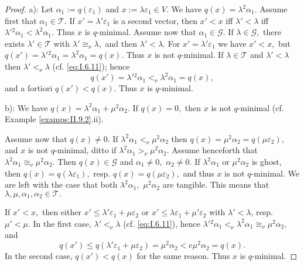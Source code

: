\documentclass [12pt,a4paper,reqno]{amsart}
\begin{document}
\begin{proof}
a): Let ${\alpha} _1:=q({\varepsilon}_1)$ and $x:={\lambda} {\varepsilon}_1\in V.$ We have $q(x)={\lambda} ^2{\alpha} _1.$ Assume
first that ${\alpha} _1\in{\mathcal T}.$ If $x'={\lambda} '{\varepsilon}_1$ is a second vector, then $x'<x$ iff ${\lambda} '<{\lambda} $
iff ${\lambda} '{}^2{\alpha} _1<{\lambda} ^2{\alpha} _1.$ Thus $x$ is $q$-minimal. Assume now that ${\alpha} _1\in{\mathcal G}.$ If
${\lambda} \in{\mathcal G},$ there exists ${\lambda} '\in{\mathcal T}$ with ${\lambda} '\cong_\nu{\lambda} ,$ and then ${\lambda} '<
{\lambda} .$ For $x'={\lambda} '{\varepsilon}_1$ we have $x'<x,$ but $q(x')={\lambda} '{}^2{\alpha} _1={\lambda} ^2{\alpha} _1=q(x).$
Thus $x$ is not $q$-minimal. If ${\lambda} \in{\mathcal T}$ and ${\lambda} '<{\lambda} $ then ${\lambda} '<_\nu{\lambda} $ (cf.
\eqref{eq:I.6.11}); hence $$q(x')={\lambda} '{}^2{\alpha} _1<_\nu{\lambda} ^2{\alpha} _1=q(x),$$ and a fortiori $q(x')<q(x).$ Thus $x$
is $q$-minimal.
{\vskip 1.5mm \noindent}

 b): We have $q(x)={\lambda} ^2{\alpha} _1+\mu^2{\alpha} _2.$ If $q(x)=0,$ then $x$ is not $q$-minimal (cf. Example \ref{examps:II.9.2}.ii).

Assume now that $q(x)\ne0.$ If ${\lambda} ^2{\alpha} _1<_\nu\mu^2{\alpha} _2$ then $q(x)=\mu^2{\alpha} _2=q(\mu{\varepsilon}_2),$
and $x$ is not $q$-minimal, ditto if ${\lambda} ^2{\alpha} _1>_\nu\mu^2{\alpha} _2.$ Assume henceforth that ${\lambda} ^2{\alpha} _1
\cong_\nu\mu^2{\alpha} _2.$ Then $q(x)\in{\mathcal G}$ and ${\alpha} _1\ne0,$ ${\alpha} _2\ne0.$ If ${\lambda} ^2{\alpha} _1$ or
$\mu^2{\alpha} _2$ is ghost, then $q(x)=q({\lambda} {\varepsilon}_1),$ resp. $q(x)=q(\mu{\varepsilon}_2),$ and thus $x$ is not
$q$-minimal. We are left with the case that both ${\lambda} ^2{\alpha} _1,$ $\mu^2{\alpha} _2$ are tangible. This means that
${\lambda} ,\mu,{\alpha} _1,{\alpha} _2\in {\mathcal T}.$

If $x'<x,$ then either $x'\le {\lambda} '{\varepsilon}_1+\mu{\varepsilon}_2$ or $x'\le {\lambda} {\varepsilon}_1+\mu'{\varepsilon}_2$
with ${\lambda} '<{\lambda} $, resp. $\mu'<\mu.$ In the first case, ${\lambda} '<_\nu{\lambda}  $ (cf.  \eqref{eq:I.6.11}),
hence ${\lambda} '{}^2{\alpha} _1<_\nu{\lambda} ^2{\alpha} _1\cong_\nu\mu^2{\alpha} _2,$ and
$$q(x')\leq q({\lambda} '{\varepsilon}_1+\mu{\varepsilon}_2)=\mu^2{\alpha} _2<e\mu^2{\alpha} _2=q(x).$$
In the second case, $q(x')<q(x)$ for the same reason. Thus $x$ is $q$-minimal.
\end{proof}
\end{document}

